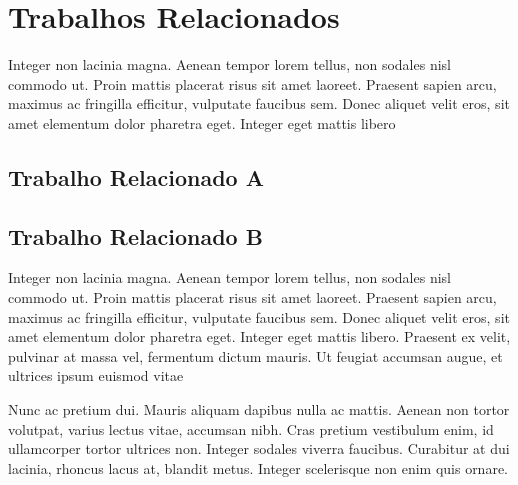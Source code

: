 \chapter{Trabalhos Relacionados}
\label{cap:trabalhos-relacionados}

Integer non lacinia magna. Aenean tempor lorem tellus, non sodales nisl commodo ut. Proin mattis placerat risus sit amet laoreet. Praesent sapien arcu, maximus ac fringilla efficitur, vulputate faucibus sem. Donec aliquet velit eros, sit amet elementum dolor pharetra eget. Integer eget mattis libero

\section{Trabalho Relacionado A}
\label{sec:trabalho-relacionado-a}

\lipsum[10]

\begin{figure}[H]
	\centering	
\end{figure}
	
\lipsum[11]

\section{Trabalho Relacionado B}
\label{sec:trabalho-relacionado-b}

Integer non lacinia magna. Aenean tempor lorem tellus, non sodales nisl commodo ut. Proin mattis placerat risus sit amet laoreet. Praesent sapien arcu, maximus ac fringilla efficitur, vulputate faucibus sem. Donec aliquet velit eros, sit amet elementum dolor pharetra eget. Integer eget mattis libero. Praesent ex velit, pulvinar at massa vel, fermentum dictum mauris. Ut feugiat accumsan augue, et ultrices ipsum euismod vitae

\begin{figure}[H]
\centering
{}	
\end{figure}

Nunc ac pretium dui. Mauris aliquam dapibus nulla ac mattis. Aenean non tortor volutpat, varius lectus vitae, accumsan nibh. Cras pretium vestibulum enim, id ullamcorper tortor ultrices non. Integer sodales viverra faucibus. Curabitur at dui lacinia, rhoncus lacus at, blandit metus. Integer scelerisque non enim quis ornare.
	
